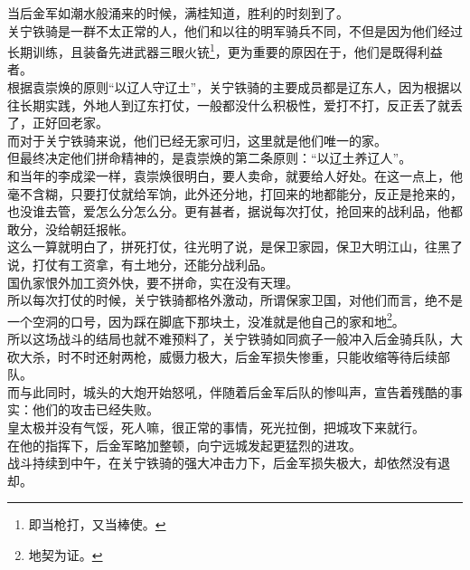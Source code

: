 \begin{multicols}{\theparacolNo}
当后金军如潮水般涌来的时候，满桂知道，胜利的时刻到了。\\

关宁铁骑是一群不太正常的人，他们和以往的明军骑兵不同，不但是因为他们经过长期训练，且装备先进武器三眼火铳\footnote{即当枪打，又当棒使。}，更为重要的原因在于，他们是既得利益者。\\

根据袁崇焕的原则“以辽人守辽土”，关宁铁骑的主要成员都是辽东人，因为根据以往长期实践，外地人到辽东打仗，一般都没什么积极性，爱打不打，反正丢了就丢了，正好回老家。\\

而对于关宁铁骑来说，他们已经无家可归，这里就是他们唯一的家。\\

但最终决定他们拼命精神的，是袁崇焕的第二条原则：“以辽土养辽人”。\\

和当年的李成梁一样，袁崇焕很明白，要人卖命，就要给人好处。在这一点上，他毫不含糊，只要打仗就给军饷，此外还分地，打回来的地都能分，反正是抢来的，也没谁去管，爱怎么分怎么分。更有甚者，据说每次打仗，抢回来的战利品，他都敢分，没给朝廷报帐。\\

这么一算就明白了，拼死打仗，往光明了说，是保卫家园，保卫大明江山，往黑了说，打仗有工资拿，有土地分，还能分战利品。\\

国仇家恨外加工资外快，要不拼命，实在没有天理。\\

所以每次打仗的时候，关宁铁骑都格外激动，所谓保家卫国，对他们而言，绝不是一个空洞的口号，因为踩在脚底下那块土，没准就是他自己的家和地\footnote{地契为证。}。\\

所以这场战斗的结局也就不难预料了，关宁铁骑如同疯子一般冲入后金骑兵队，大砍大杀，时不时还射两枪，威慑力极大，后金军损失惨重，只能收缩等待后续部队。\\

而与此同时，城头的大炮开始怒吼，伴随着后金军后队的惨叫声，宣告着残酷的事实：他们的攻击已经失败。\\

皇太极并没有气馁，死人嘛，很正常的事情，死光拉倒，把城攻下来就行。\\

在他的指挥下，后金军略加整顿，向宁远城发起更猛烈的进攻。\\

战斗持续到中午，在关宁铁骑的强大冲击力下，后金军损失极大，却依然没有退却。\\


\end{multicols}
